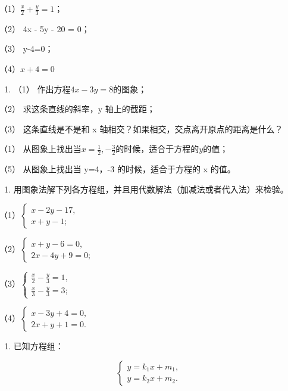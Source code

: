 （1）\(\frac{x}{2} + \frac{y}{3} = 1\)；

（2） 4x - 5y - 20 = 0；

（3） y-4=0；

（4）\(x + 4 = 0\)

\begin{enumerate}[start=2]
\item
  （1） 作出方程\(4x - 3y = 8\)的图象；
\end{enumerate}

（2） 求这条直线的斜率，y 轴上的截距；

（3） 这条直线是不是和 x 轴相交？如果相交，交点离开原点的距离是什么？

（1）
从图象上找出当\(x = \frac{1}{2}, -\frac{3}{2}\)的时候，适合于方程的\(y\)的值；

（5） 从图象上找出当 y=4，-3 的时候，适合于方程的 x 的值。

\begin{enumerate}[start=3]
\item
  用图象法解下列各方程组，并且用代数解法（加减法或者代入法）来检验。
\end{enumerate}

（1）\(\left\{ \begin{array}{l} x - 2y - 17, \\ x + y - 1; \end{array} \right.\)

（2）\(\left\{ \begin{array}{l} x + y - 6 = 0, \\ 2x - 4y + 9 = 0; \end{array} \right.\)

（3）\(\left\{ \begin{array}{l} \frac{x}{2} - \frac{y}{3} = 1, \\ \frac{x}{3} - \frac{y}{3} = 3; \end{array} \right.\)

（4）\(\left\{ \begin{array}{l} x - 3y + 4 = 0, \\ 2x + y + 1 = 0. \end{array} \right.\)

\begin{enumerate}[start=4]
\item
  已知方程组：
\end{enumerate}

\[
\left\{ \begin{array}{l} y = k_{1} x + m_{1}, \\ y = k_{2} x + m_{2}. \end{array} \right.
\]


